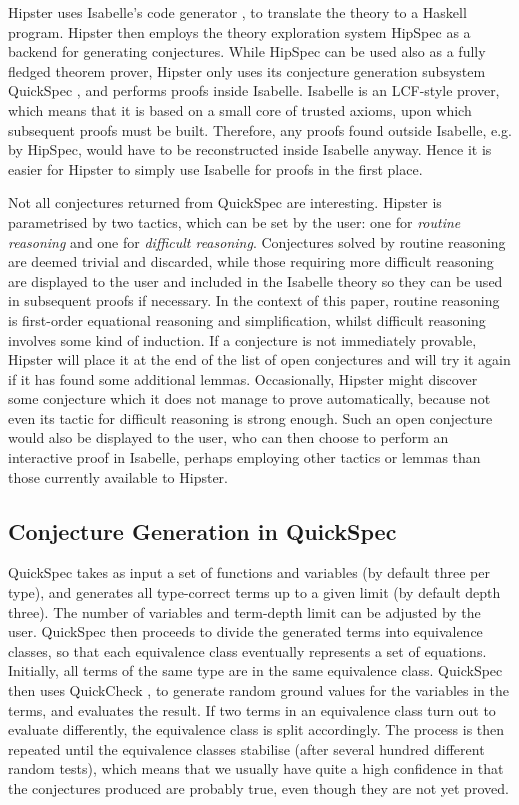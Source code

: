 \noindent Hipster uses Isabelle's code generator \cite{codegen2}, to translate the theory to a Haskell program.
%
Hipster then employs the theory exploration system HipSpec as a backend for generating conjectures.
%
While HipSpec can be used also as a fully fledged theorem prover, Hipster only uses its conjecture generation subsystem QuickSpec \cite{quickspec}, and performs proofs inside Isabelle.
%
Isabelle is an LCF-style prover, which means that it is based on a small core of trusted axioms, upon which subsequent proofs must be built.
%
Therefore, any proofs found outside Isabelle, e.g. by HipSpec, would have to be reconstructed inside Isabelle anyway.
%
Hence it is easier for Hipster to simply use Isabelle for proofs in the first place. 

Not all conjectures returned from QuickSpec are interesting.
%
Hipster is parametrised by two tactics, which can be set by the user: one for \emph{routine reasoning} and one for \emph{difficult reasoning}.
%
Conjectures solved by routine reasoning are deemed trivial and discarded, while those requiring more difficult reasoning are displayed to the user and included in the Isabelle theory so they can be used in subsequent proofs if necessary.
%
In the context of this paper, routine reasoning is first-order equational reasoning and simplification, whilst difficult reasoning involves some kind of induction.
%
If a conjecture is not immediately provable, Hipster will place it at the end of the list of open conjectures and will try it again if it has found some additional lemmas.
%
Occasionally, Hipster might discover some conjecture which it does not manage to prove automatically, because not even its tactic for difficult reasoning is strong enough.
%
Such an open conjecture would also be displayed to the user, who can then choose to perform an interactive proof in Isabelle, perhaps employing other tactics or lemmas than those currently available to Hipster.


\subsection{Conjecture Generation in QuickSpec}
QuickSpec takes as input a set of functions and variables (by default three per type), and generates all type-correct terms up to a given limit (by default depth three).
%
The number of variables and term-depth limit can be adjusted by the user.
%
QuickSpec then proceeds to divide the generated terms into equivalence classes, so that each equivalence class eventually represents a set of equations.
%
Initially, all terms of the same type are in the same equivalence class.
%
QuickSpec then uses QuickCheck \cite{quickcheck}, to generate random ground values for the variables in the terms, and evaluates the result.
%
If two terms in an equivalence class turn out to evaluate differently, the equivalence class is split accordingly.
%
The process is then repeated until the equivalence classes stabilise (after several hundred different random tests), which means that we usually have quite a high confidence in that the conjectures produced are probably true, even though they are not yet proved.  

